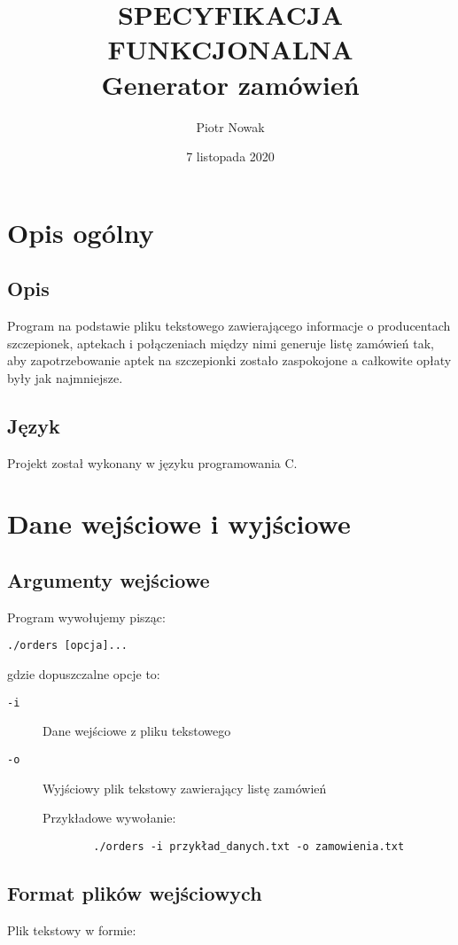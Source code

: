 \documentclass[a4paper,12pt,twoside]{article}
\title{SPECYFIKACJA FUNKCJONALNA\\Generator zamówień}
\date{7 listopada 2020}
\author{Piotr Nowak}
\begin{document}
\maketitle

\section{Opis ogólny}
\subsection{Opis}
Program  na podstawie pliku tekstowego zawierającego informacje o producentach szczepionek, aptekach i połączeniach między nimi generuje listę zamówień tak, aby zapotrzebowanie aptek na szczepionki zostało zaspokojone a  całkowite opłaty były jak najmniejsze.
\subsection{Język}
Projekt został wykonany w języku programowania C.
\section{Dane wejściowe i wyjściowe}
\subsection{Argumenty wejściowe}
Program wywołujemy pisząc:

\medskip

   \quad \texttt{./orders [opcja]...} 

\bigskip

gdzie dopuszczalne opcje to:
\begin{description}

\item[\texttt {-i }] Dane wejściowe z pliku tekstowego 

\item[\texttt {-o }] Wyjściowy plik tekstowy zawierający listę zamówień

Przykładowe wywołanie:
\medskip
\begin{verbatim}
		./orders -i przykład_danych.txt -o zamowienia.txt 
\end{verbatim}
\end{description}
\newpage
\subsection{Format plików wejściowych}
Plik tekstowy w formie:
\end{document}
